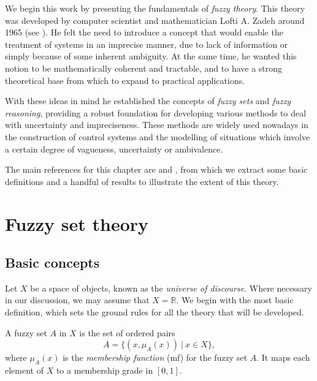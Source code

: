 %
%
%

We begin this work by presenting the fundamentals of \textit{fuzzy theory}. This theory was developed by computer scientist and mathematician Lofti A. Zadeh around 1965 (see \cite{zadeh1965fuzzy}). He felt the need to introduce a concept that would enable the treatment of systems in an imprecise manner, due to lack of information or simply because of some inherent ambiguity. At the same time, he wanted this notion to be mathematically coherent and tractable, and to have a strong theoretical base from which to expand to practical applications.

With these ideas in mind he established the concepts of \textit{fuzzy sets} and \textit{fuzzy reasoning}, providing a robust foundation for developing various methods to deal with uncertainty and impreciseness. These methods are widely used nowadays in the construction of control systems and the modelling of situations which involve a certain degree of vagueness, uncertainty or ambivalence.

The main references for this chapter are \cite{chen2000introduction} and \cite{jang1997neuro}, from which we extract some basic definitions and a handful of results to illustrate the extent of this theory.

\section{Fuzzy set theory}

\subsection{Basic concepts}

Let $X$ be a space of objects, known as the \textit{universe of discourse}. Where necessary in our discussion, we may assume that $X = \mathbb{R}$. We begin with the most basic definition, which sets the ground rules for all the theory that will be developed.

\begin{definition} A fuzzy set $A$ in $X$ is the set of ordered pairs
\[
A = \{ (x, \mu_A(x)) \ | \ x \in X \},
\]
where $\mu_A(x)$ is the \textit{membership function} (\acrshort{mf}) for the fuzzy set $A$. It maps each element of $X$ to a membership grade in $[0,1]$.
\end{definition}

